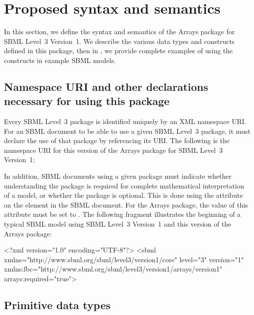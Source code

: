 
\section{Proposed syntax and semantics}
\label{syntax}

In this section, we define the syntax and semantics of the Arrays package for SBML Level~3 Version~1.   We describe the various data types and constructs defined in this package, then in , we provide complete examples of using the constructs in example SBML models.

\subsection{Namespace URI and other declarations necessary for using this package}
\label{xml-namespace}

Every SBML Level~3 package is identified uniquely by an XML namespace URI.
For an SBML document to be able to use a given SBML Level~3 package, it
must declare the use of that package by referencing its URI.   The following
is the namespace URI for this version of the Arrays
package for SBML Level~3 Version~1:
\begin{center}
\end{center}

In addition, SBML documents using a given package must indicate whether
understanding the package is required for complete mathematical
interpretation of a model, or whether the package is optional.   This is
done using the attribute  on the  element in
the SBML document.   For the Arrays package, the value of
this attribute must be set to .
The following fragment illustrates the beginning of a typical SBML model
using SBML Level~3 Version~1 and this version of the Arrays package:

\begin{example}
<?xml version="1.0" encoding="UTF-8"?>
<sbml xmlns="http://www.sbml.org/sbml/level3/version1/core" level="3" version="1"
           xmlns:fbc="http://www.sbml.org/sbml/level3/version1/arrays/version1" arrays:required="true">
\end{example}

\subsection{Primitive data types}

